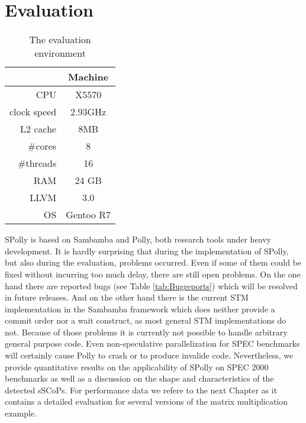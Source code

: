
\chapter{Evaluation} %
\label{Chapter5}

\begin{wraptable}[]{r}{0.36\textwidth}
  \vspace*{-6mm}
  \begin{framed}
  \caption{The evaluation environment}
    \begin{tabular}{ r | c }
      & Machine \\
      \hline
            CPU &  X5570 \\ 
    clock speed & 2.93GHz \\
    L2 cache &  8MB \\
        \#cores &  8 \\
      \#threads &  16 \\
            RAM &  24 GB \\
           LLVM &  3.0 \\
            OS &  Gentoo R7 \\
    \end{tabular}
  \label{tab:EvaluationEnvironment}
  \end{framed}
  \vspace*{-9mm}
\end{wraptable}
SPolly is based on Sambamba and Polly, both research tools under heavy development.
It is hardly surprising that during the implementation of SPolly, 
but also during the evaluation,  problems occurred. 
Even if some of them could be fixed without incurring too much delay, there are still
open problems. On the one hand there are reported bugs (see Table \ref{tab:Bugreports})
which will be resolved in future releases. And on the other hand there is the
current STM implementation in the Sambamba framework which does neither provide
a commit order nor a wait construct, as most general STM implementations do not.
Because of those problems it is currently not possible to handle arbitrary general 
purpose code. Even non-speculative parallelization for SPEC benchmarks will 
certainly cause Polly to crash or to produce invalide code.
Nevertheless, we provide quantitative results on the applicability of 
SPolly on SPEC 2000 benchmarks as well as 
a discussion on the shape and characteristics 
of the detected sSCoPs. For performance data we refere to the next Chapter as it 
contains a detailed evaluation for several versions of the  matrix multiplication example. 


